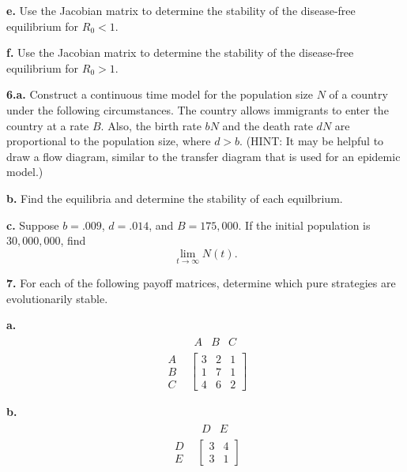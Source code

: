 \documentclass[reqno,12pt]{amsart}
\begin{document}
\noindent
{\bf e.}  Use the Jacobian matrix to determine the stability of
the disease-free equilibrium for $R_0 < 1$.

\noindent
{\bf f.}  Use the Jacobian matrix to determine the stability of
the disease-free equilibrium for $R_0 > 1$.


\vspace{1cm}

\noindent
{\bf 6.a.}  Construct a continuous time model for the population size
$N$ of a country under the following circumstances.  The country
allows immigrants to enter the country at a rate $B$.  Also, the
birth rate $bN$ and the death rate $dN$ are proportional to the
population size, where $d>b$.  (HINT: It may be helpful to draw a
flow diagram, similar to the transfer diagram that is used for an
epidemic model.)

\noindent
{\bf b.}  Find the equilibria and determine the stability of each equilbrium.

\noindent
{\bf c.}  Suppose $b=.009$, $d=.014$, and $B=175,000$.  If the
initial population is $30,000,000$, find
$$
\lim_{t \to \infty} N(t).
$$


\vspace{1cm}

\noindent
{\bf 7.}  For each of the following payoff matrices, determine which pure
strategies are evolutionarily stable.

\noindent
{\bf a.}
$$
\begin{matrix}
  & \begin{matrix} A & B & C \end{matrix} 	\\
\begin{matrix} A \\ B \\ C \end{matrix}		&
\begin{bmatrix}
3 & 2 & 1 	\\
1 & 7 & 1	\\
4 & 6 & 2
\end{bmatrix}
\end{matrix}
$$

\noindent
{\bf b.}
$$
\begin{matrix}
  & \begin{matrix} D & E \end{matrix} 	\\
\begin{matrix} D \\ E \end{matrix}		&
\begin{bmatrix}
3 & 4 	\\
3 & 1
\end{bmatrix}
\end{matrix}
$$
\end{document}
